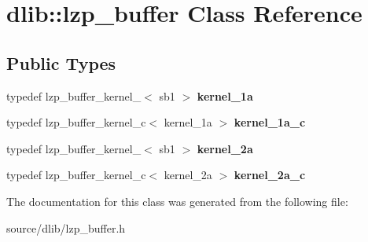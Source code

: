 \hypertarget{classdlib_1_1lzp__buffer}{
\section{dlib::lzp\_\-buffer Class Reference}
\label{classdlib_1_1lzp__buffer}
}
\subsection*{Public Types}
\begin{DoxyCompactItemize}
\item 
\hypertarget{classdlib_1_1lzp__buffer_a9b4ed39994855ad0a2fb63fa140a0123}{
typedef lzp\_\-buffer\_\-kernel\_$<$ sb1 $>$ {\bfseries kernel\_\-1a}}
\label{classdlib_1_1lzp__buffer_a9b4ed39994855ad0a2fb63fa140a0123}

\item 
\hypertarget{classdlib_1_1lzp__buffer_a2b831404963c2289b6c6b831b8737ee2}{
typedef lzp\_\-buffer\_\-kernel\_\-c$<$ kernel\_\-1a $>$ {\bfseries kernel\_\-1a\_\-c}}
\label{classdlib_1_1lzp__buffer_a2b831404963c2289b6c6b831b8737ee2}

\item 
\hypertarget{classdlib_1_1lzp__buffer_ab714f89153a27a3ab960ece2d885835b}{
typedef lzp\_\-buffer\_\-kernel\_$<$ sb1 $>$ {\bfseries kernel\_\-2a}}
\label{classdlib_1_1lzp__buffer_ab714f89153a27a3ab960ece2d885835b}

\item 
\hypertarget{classdlib_1_1lzp__buffer_a66368910a9a3a0c739ba877af44f12f4}{
typedef lzp\_\-buffer\_\-kernel\_\-c$<$ kernel\_\-2a $>$ {\bfseries kernel\_\-2a\_\-c}}
\label{classdlib_1_1lzp__buffer_a66368910a9a3a0c739ba877af44f12f4}

\end{DoxyCompactItemize}


The documentation for this class was generated from the following file:\begin{DoxyCompactItemize}
\item 
source/dlib/lzp\_\-buffer.h\end{DoxyCompactItemize}
